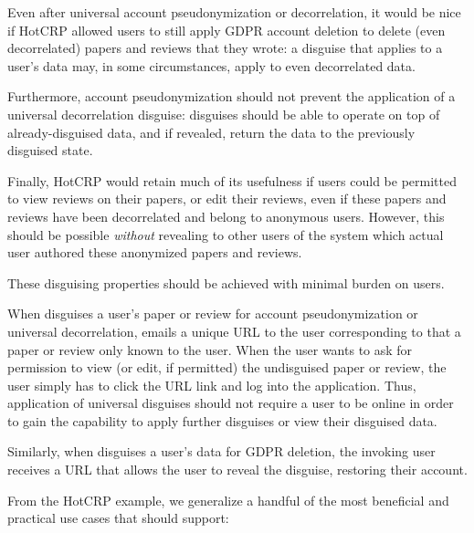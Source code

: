 Even after universal account pseudonymization or decorrelation, it would be nice if HotCRP allowed
users to still apply GDPR account deletion to delete (even decorrelated) papers and reviews that they
wrote: a disguise that applies to a user's data may, in some circumstances, apply to even decorrelated data.

Furthermore, account pseudonymization should not prevent the application of a universal
decorrelation disguise: disguises should be able to operate on top of already-disguised data, and if
revealed, return the data to the previously disguised state. 

Finally, HotCRP would retain much of its usefulness if users could be permitted to view
reviews on their papers, or edit their reviews, even if these papers and reviews have been
decorrelated and belong to anonymous users.
However, this should be possible \emph{without} revealing to other users of the system which
actual user authored these anonymized papers and reviews.

 These disguising properties should be achieved with minimal burden on
users. 

When \sys disguises a user's paper or review for account pseudonymization or universal
decorrelation, \sys emails a unique URL to the user corresponding to that a paper or review only
known to the user. When the user wants to ask for permission to view (or edit, if permitted) the
undisguised paper or review, the user simply has to click the URL link and log into the application.
Thus, application of universal disguises should not require a user to be online in order to gain the
capability to apply further disguises or view their disguised data.

Similarly, when \sys disguises a user's data for GDPR deletion, the invoking user receives a URL
that allows the user to reveal the disguise, restoring their account.

From the HotCRP example, we generalize a handful of the most beneficial and practical use cases
that \sys should support:

